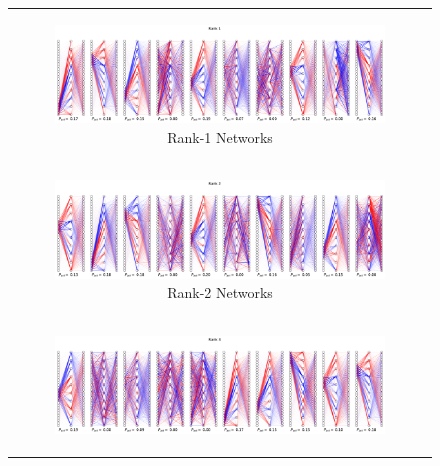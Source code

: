 \documentclass{article}
\theoremstyle{plain}
\theoremstyle{definition}
\theoremstyle{remark}
\begin{document}
  
\begin{figure}[ht]
    \centering
    \caption{Decomposing the toy model of high rank circuits into different numbers of subnetworks}\label{fig:s6_high_rank_decompositions}
    \begin{minipage}{\textwidth} %
        \centering
        \begin{tabular}{c}  %
            \begin{subfigure}{0.3\textwidth}
                \centering
                \includegraphics[width=\linewidth]{../figures/s6_high_rank_decompositions_rank1.pdf}
                \caption{Rank-1 Networks}
            \end{subfigure} \\
            \begin{subfigure}{0.3\textwidth}
                \centering
                \includegraphics[width=\linewidth]{../figures/s6_high_rank_decompositions_rank2.pdf}
                \caption{Rank-2 Networks}
            \end{subfigure} \\
            \begin{subfigure}{0.3\textwidth}
                \centering
                \includegraphics[width=\linewidth]{../figures/s6_high_rank_decompositions_rank3.pdf}

\end{subfigure}
\end{tabular}
\end{minipage}
\end{figure}
\end{document}
